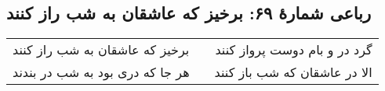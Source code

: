 \begin{center}
\section*{رباعی شمارهٔ ۶۹: برخیز که عاشقان به شب راز کنند}
\label{sec:069}
\begin{longtable}{l p{0.5cm} r}
برخیز که عاشقان به شب راز کنند
&&
گرد در و بام دوست پرواز کنند
\\
هر جا که دری بود به شب در بندند
&&
الا در عاشقان که شب باز کنند
\\
\end{longtable}
\end{center}
